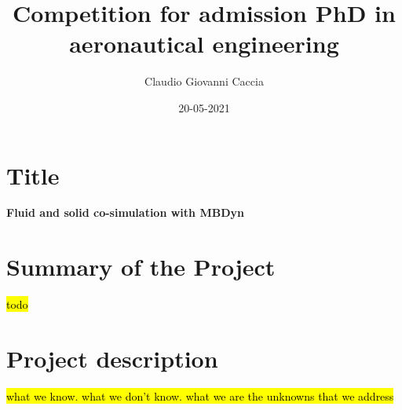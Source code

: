 \documentclass[a4paper]{article}
\title{Competition for admission PhD in \\ aeronautical engineering}
\author{Claudio Giovanni Caccia}
\date{20-05-2021}
\begin{document}
\maketitle

\section*{Title}

\textbf{Fluid and solid co-simulation with MBDyn}

\section*{Summary of the Project}

\hl{todo}


\section*{Project description}





\hl{what we know. what we don't know. what we are the unknowns that we address}



\end{document}
